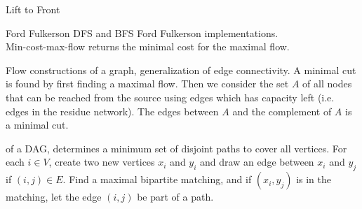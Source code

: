 


\begin{algorithm}{Lift to Front}
\end{algorithm}
\label{liftofront}

\begin{algorithm}{Ford Fulkerson}
\desc
DFS and BFS Ford Fulkerson implementations.\\
Min-cost-max-flow returns the minimal cost for the maximal flow.
\end{algorithm}

\begin{algorithm}{Flow constructions}
of a graph, generalization of edge connectivity. A minimal cut is
found by first finding a maximal flow. Then we consider the set $A$ of
all nodes that can be reached from the source using edges which has
capacity left (i.e. edges in the residue network). The edges between
$A$ and the complement of $A$ is a minimal cut.

of a DAG, determines a minimum set of disjoint paths to cover all
vertices.  For each $i \in V$, create two new vertices $x_i$ and $y_i$
and draw an edge between $x_i$ and $y_j$ if $(i,j) \in E$.  Find a
maximal bipartite matching, and if $(x_i, y_j)$ is in the matching,
let the edge $(i,j)$ be part of a path.

\end{algorithm}
